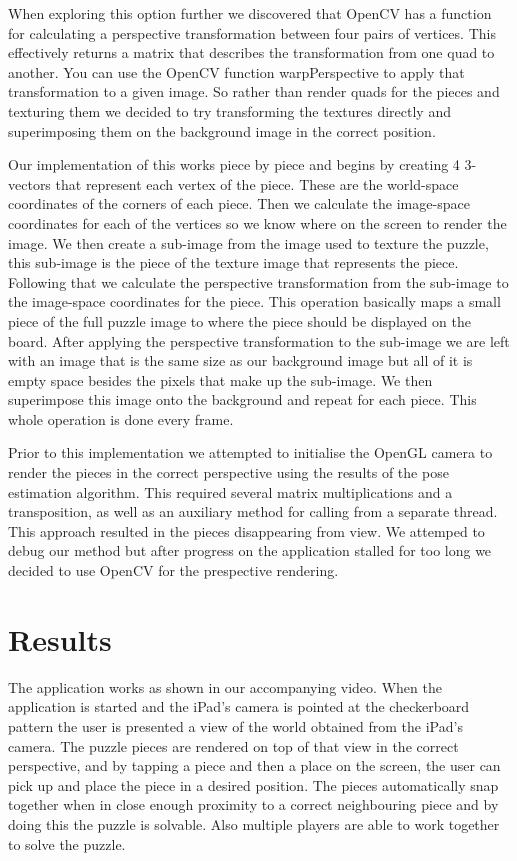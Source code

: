 \documentclass{article}
\begin{document}
When exploring this option further we discovered that OpenCV has a function for calculating a perspective transformation between four pairs of vertices. This effectively returns a matrix that describes the transformation from one quad to another. You can use the OpenCV function warpPerspective to apply that transformation to a given image. So rather than render quads for the pieces and texturing them we decided to try transforming the textures directly and superimposing them on the background image in the correct position. 

Our implementation of this works piece by piece and begins by creating 4 3-vectors that represent each vertex of the piece. These are the world-space coordinates of the corners of each piece. Then we calculate the image-space coordinates for each of the vertices so we know where on the screen to render the image. We then create a sub-image from the image used to texture the puzzle, this sub-image is the piece of the texture image that represents the piece. Following that we calculate the perspective transformation from the sub-image to the image-space coordinates for the piece. This operation basically maps a small piece of the full puzzle image to where the piece should be displayed on the board. After applying the perspective transformation to the sub-image we are left with an image that is the same size as our background image but all of it is empty space besides the pixels that make up the sub-image. We then superimpose this image onto the background and repeat for each piece. This whole operation is done every frame. 

Prior to this implementation we attempted to initialise the OpenGL camera to render the pieces in the correct perspective using the results of the pose estimation algorithm. This required several matrix multiplications and a transposition, as well as an auxiliary method for calling from a separate thread. This approach resulted in the pieces disappearing from view. We attemped to debug our method but after progress on the application stalled for too long we decided to use OpenCV for the prespective rendering. 

\section{Results}

The application works as shown in our accompanying video. When the application is started and the iPad's camera is pointed at the checkerboard pattern the user is presented a view of the world obtained from the iPad's camera. The puzzle pieces are rendered on top of that view in the correct perspective, and by tapping a piece and then a place on the screen, the user can pick up and place the piece in a desired position. The pieces automatically snap together when in close enough proximity to a correct neighbouring piece and by doing this the puzzle is solvable. Also multiple players are able to work together to solve the puzzle. 
\end{document}
